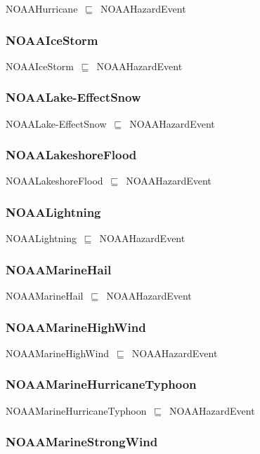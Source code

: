 \documentclass{article}
\begin{document}
NOAAHurricane~\ensuremath{\sqsubseteq}~NOAAHazardEvent~

\subsubsection*{NOAAIceStorm}

NOAAIceStorm~\ensuremath{\sqsubseteq}~NOAAHazardEvent~

\subsubsection*{NOAALake-EffectSnow}

NOAALake-EffectSnow~\ensuremath{\sqsubseteq}~NOAAHazardEvent~

\subsubsection*{NOAALakeshoreFlood}

NOAALakeshoreFlood~\ensuremath{\sqsubseteq}~NOAAHazardEvent~

\subsubsection*{NOAALightning}

NOAALightning~\ensuremath{\sqsubseteq}~NOAAHazardEvent~

\subsubsection*{NOAAMarineHail}

NOAAMarineHail~\ensuremath{\sqsubseteq}~NOAAHazardEvent~

\subsubsection*{NOAAMarineHighWind}

NOAAMarineHighWind~\ensuremath{\sqsubseteq}~NOAAHazardEvent~

\subsubsection*{NOAAMarineHurricaneTyphoon}

NOAAMarineHurricaneTyphoon~\ensuremath{\sqsubseteq}~NOAAHazardEvent~

\subsubsection*{NOAAMarineStrongWind}
\end{document}
